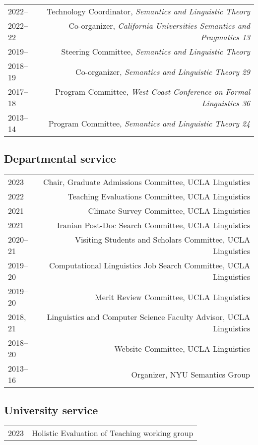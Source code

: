 \documentclass[12pt]{article}
\begin{document}
\begin{longtable}{LR}
  2022--     & Technology Coordinator, \textit{Semantics and Linguistic Theory}\\
  2022--22   & Co-organizer, \textit{California Universities Semantics and
               Pragmatics 13}\\
  2019--     & Steering Committee, \textit{Semantics and Linguistic Theory}\\
  2018--19   & Co-organizer, \textit{Semantics and Linguistic Theory 29}\\
  2017--18   & Program Committee, \textit{West Coast Conference on Formal
               Linguistics 36}\\
  2013--14   & Program Committee, \textit{Semantics and Linguistic Theory 24}
\end{longtable}

\subsection*{Departmental service}

\begin{longtable}{LR}
  2023       & Chair, Graduate Admissions Committee, UCLA Linguistics\\
  2022       & Teaching Evaluations Committee, UCLA Linguistics\\
  2021       & Climate Survey Committee, UCLA Linguistics\\
  2021       & Iranian Post-Doc Search Committee, UCLA Linguistics\\
  2020--21   & Visiting Students and Scholars Committee, UCLA Linguistics\\
  2019--20   & Computational Linguistics Job Search Committee, UCLA Linguistics\\
  2019--20   & Merit Review Committee, UCLA Linguistics\\
  2018, 21%
             & Linguistics and Computer Science Faculty Advisor, UCLA Linguistics\\
  2018--20   & Website Committee, UCLA Linguistics\\
  2013--16   & Organizer, NYU Semantics Group
\end{longtable}

\subsection*{University service}

\begin{longtable}{LR}
  2023       & Holistic Evaluation of Teaching working group
\end{longtable}
\end{document}

